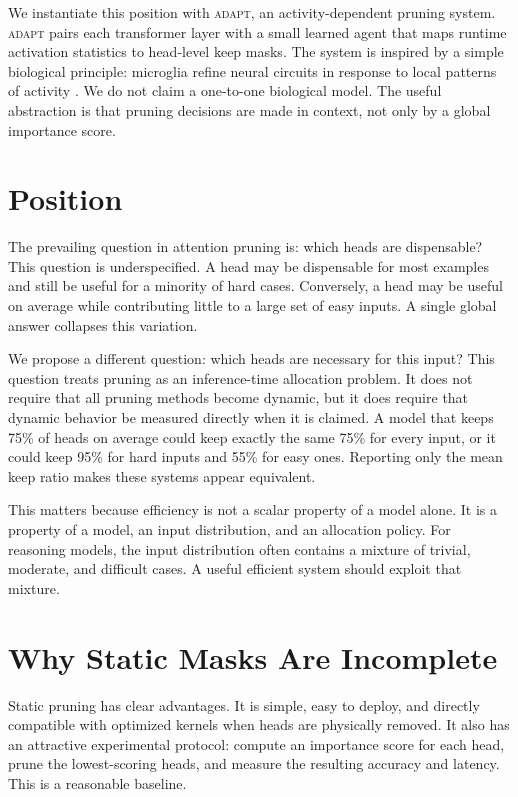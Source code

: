 \documentclass{article}
\newcommand{\method}{\textsc{adapt}}
\begin{document}
We instantiate this position with \method{}, an activity-dependent pruning
system. \method{} pairs each transformer layer with a small learned agent that
maps runtime activation statistics to head-level keep masks. The system is
inspired by a simple biological principle: microglia refine neural circuits in
response to local patterns of activity
\citep{stevens2007complement,paolicelli2011synaptic}. We do not claim a
one-to-one biological model. The useful abstraction is that pruning decisions
are made in context, not only by a global importance score.

\section{Position}

The prevailing question in attention pruning is: which heads are dispensable?
This question is underspecified. A head may be dispensable for most examples
and still be useful for a minority of hard cases. Conversely, a head may be
useful on average while contributing little to a large set of easy inputs. A
single global answer collapses this variation.

We propose a different question: which heads are necessary for this input? This
question treats pruning as an inference-time allocation problem. It does not
require that all pruning methods become dynamic, but it does require that
dynamic behavior be measured directly when it is claimed. A model that keeps
75\% of heads on average could keep exactly the same 75\% for every input, or
it could keep 95\% for hard inputs and 55\% for easy ones. Reporting only the
mean keep ratio makes these systems appear equivalent.

This matters because efficiency is not a scalar property of a model alone. It
is a property of a model, an input distribution, and an allocation policy. For
reasoning models, the input distribution often contains a mixture of trivial,
moderate, and difficult cases. A useful efficient system should exploit that
mixture.

\section{Why Static Masks Are Incomplete}

Static pruning has clear advantages. It is simple, easy to deploy, and directly
compatible with optimized kernels when heads are physically removed. It also
has an attractive experimental protocol: compute an importance score for each
head, prune the lowest-scoring heads, and measure the resulting accuracy and
latency. This is a reasonable baseline.
\end{document}
